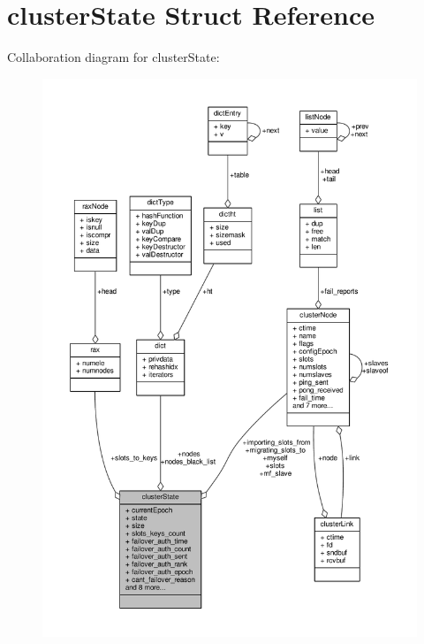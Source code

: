 \hypertarget{structclusterState}{}\section{cluster\+State Struct Reference}
\label{structclusterState}


Collaboration diagram for cluster\+State\+:\nopagebreak
\begin{figure}[H]
\begin{center}
\leavevmode
\includegraphics[width=350pt]{structclusterState__coll__graph}
\end{center}
\end{figure}
